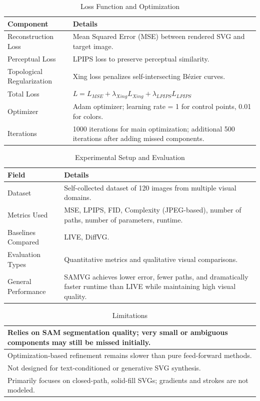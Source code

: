 \begin{table}[h!]
\centering
\caption{Loss Function and Optimization}
\begin{tabular}{|l|p{10cm}|}
\hline
\textbf{Component} & \textbf{Details} \\ \hline
Reconstruction Loss &
Mean Squared Error (MSE) between rendered SVG and target image. \\ \hline
Perceptual Loss &
LPIPS loss to preserve perceptual similarity. \\ \hline
Topological Regularization &
Xing loss penalizes self-intersecting Bézier curves. \\ \hline
Total Loss &
$L = L_{MSE} + \lambda_{Xing} L_{Xing} + \lambda_{LPIPS} L_{LPIPS}$ \\ \hline
Optimizer &
Adam optimizer; learning rate = 1 for control points, 0.01 for colors. \\ \hline
Iterations &
1000 iterations for main optimization; additional 500 iterations after adding missed components. \\ \hline
\end{tabular}
\end{table}

\begin{table}[h!]
\centering
\caption{Experimental Setup and Evaluation}
\begin{tabular}{|l|p{10cm}|}
\hline
\textbf{Field} & \textbf{Details} \\ \hline
Dataset &
Self-collected dataset of 120 images from multiple visual domains. \\ \hline
Metrics Used &
MSE, LPIPS, FID, Complexity (JPEG-based), number of paths, number of parameters, runtime. \\ \hline
Baselines Compared &
LIVE, DiffVG. \\ \hline
Evaluation Types &
Quantitative metrics and qualitative visual comparisons. \\ \hline
General Performance &
SAMVG achieves lower error, fewer paths, and dramatically faster runtime than LIVE while maintaining high visual quality. \\ \hline
\end{tabular}
\end{table}


\begin{table}[h!]
\centering
\caption{Limitations}
\begin{tabular}{|p{14cm}|}
\hline
Relies on SAM segmentation quality; very small or ambiguous components may still be missed initially. \\ \hline
Optimization-based refinement remains slower than pure feed-forward methods. \\ \hline
Not designed for text-conditioned or generative SVG synthesis. \\ \hline
Primarily focuses on closed-path, solid-fill SVGs; gradients and strokes are not modeled. \\ \hline
\end{tabular}
\end{table}




